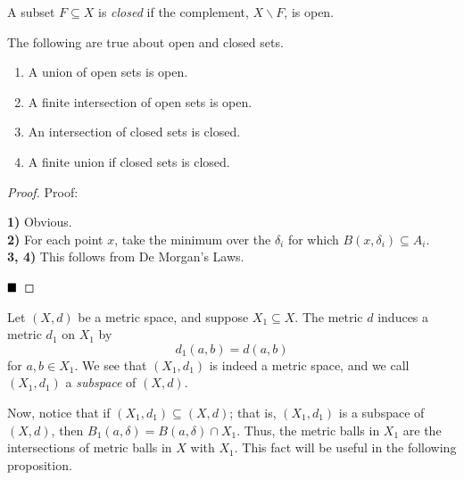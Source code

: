 \begin{definition}
	A subset $F \subseteq X$ is \emph{closed} if the complement, $X \backslash F$, is open. 
\end{definition}

\begin{lemma}
	The following are true about open and closed sets.
	\begin{enumerate}
		\item A union of open sets is open.
		\item A finite intersection of open sets is open.
		\item An intersection of closed sets is closed.
		\item A finite union if closed sets is closed.
	\end{enumerate}
\end{lemma}
\begin{proof}{Proof:}
	
	\textbf{1)} Obvious.\\

	\textbf{2)} For each point $x$, take the minimum over the $\delta_i$ for which $B(x, \delta_i) \subseteq A_i$.\\

	\textbf{3, 4)} This follows from De Morgan's Laws.

	$\qed$
\end{proof}

\begin{definition}
	Let $(X, d)$ be a metric space, and suppose $X_1 \subseteq X$. The metric $d$ induces a metric $d_1$ on $X_1$ by
	\[ d_1(a, b) = d(a, b) \]
	for $a, b \in X_1$. We see that $(X_1, d_1)$ is indeed a metric space, and we call $(X_1, d_1)$ a \emph{subspace} of $(X, d)$. 
\end{definition}

Now, notice that if $(X_1, d_1) \subseteq (X, d)$; that is, $(X_1, d_1)$ is a subspace of $(X, d)$, then $B_1(a, \delta) = B(a, \delta) \cap X_1$. Thus, the metric balls in $X_1$ are the intersections of metric balls in $X$ with $X_1$. This fact will be useful in the following proposition.

